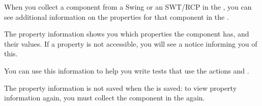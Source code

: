 
When you collect a component from a Swing or an SWT/RCP \gdaut{} in the \gdomm{} , you can see additional information on the properties for that component in the \gdpropview{}. 

The property information shows you which properties the component has, and their values. If a property is not accessible, you will see a notice informing you of this. 

You can use this information to help you write tests that use the actions  and . 

The property information is not saved when the \gdomeditor{} is saved: to view property information again, you must collect the component in the \gdomm{} again. 
